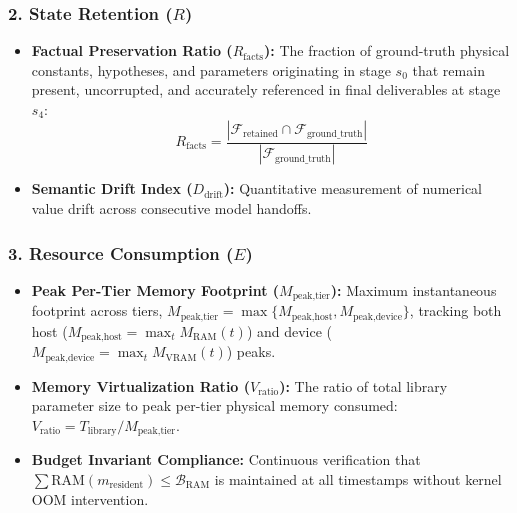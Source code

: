 \subsubsection{2. State Retention (\texorpdfstring{$R$}{R})}
\begin{itemize}
    \item \textbf{Factual Preservation Ratio ($R_{\text{facts}}$):} The fraction of ground-truth physical constants, hypotheses, and parameters originating in stage $s_0$ that remain present, uncorrupted, and accurately referenced in final deliverables at stage $s_4$:
    \begin{equation}
    R_{\text{facts}} = \frac{|\mathcal{F}_{\text{retained}} \cap \mathcal{F}_{\text{ground\_truth}}|}{|\mathcal{F}_{\text{ground\_truth}}|}
    \end{equation}
    \item \textbf{Semantic Drift Index ($D_{\text{drift}}$):} Quantitative measurement of numerical value drift across consecutive model handoffs.
\end{itemize}

\subsubsection{3. Resource Consumption (\texorpdfstring{$E$}{E})}
\begin{itemize}
    \item \textbf{Peak Per-Tier Memory Footprint ($M_{\text{peak,tier}}$):} Maximum instantaneous footprint across tiers, $M_{\text{peak,tier}} = \max \{ M_{\text{peak,host}}, M_{\text{peak,device}} \}$, tracking both host ($M_{\text{peak,host}} = \max_t M_{\text{RAM}}(t)$) and device ($M_{\text{peak,device}} = \max_t M_{\text{VRAM}}(t)$) peaks.
    \item \textbf{Memory Virtualization Ratio ($V_{\text{ratio}}$):} The ratio of total library parameter size to peak per-tier physical memory consumed: $V_{\text{ratio}} = T_{\text{library}} / M_{\text{peak,tier}}$.
    \item \textbf{Budget Invariant Compliance:} Continuous verification that $\sum \text{RAM}(m_{\text{resident}}) \le \mathcal{B}_{\text{RAM}}$ is maintained at all timestamps without kernel OOM intervention.
\end{itemize}

